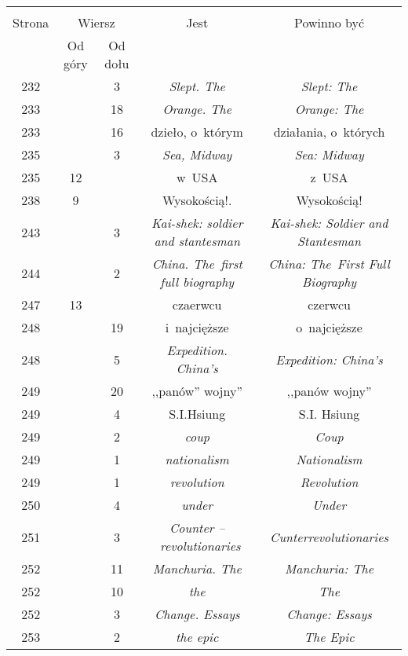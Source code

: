 \documentclass[a4paper,11pt]{article}
\begin{document}
\begin{center}
  \begin{tabular}{|c|c|c|c|c|}
    \hline
    & \multicolumn{2}{c|}{} & & \\
    Strona & \multicolumn{2}{c|}{Wiersz} & Jest
                              & Powinno być \\ \cline{2-3}
    & Od góry & Od dołu & & \\
    \hline
    232 & &  3 & \emph{Slept. The} & \emph{Slept: The} \\
    233 & & 18 & \emph{Orange. The} & \emph{Orange: The} \\
    233 & & 16 & dzieło, o~którym & działania, o~których \\
    235 & &  3 & \emph{Sea, Midway} & \emph{Sea: Midway} \\
    235 & 12 & & w~USA & z~USA \\
    238 &  9 & & Wysokością!. & Wysokością! \\
    243 & &  3 & \emph{Kai-shek: soldier and stantesman}
           & \emph{Kai-shek: Soldier and Stantesman} \\
    244 & &  2 & \emph{China. The~first full biography}
           & \emph{China: The~First Full Biography} \\
    247 & 13 & & czaerwcu & czerwcu \\
    248 & & 19 & i~najcięższe & o~najcięższe \\
    248 & &  5 & \emph{Expedition. China's} & \emph{Expedition: China's} \\
    249 & & 20 & ,,panów'' wojny'' & ,,panów wojny'' \\
    249 & &  4 & S.I.Hsiung & S.I. Hsiung \\
    249 & &  2 & \emph{coup} & \emph{Coup} \\
    249 & &  1 & \emph{nationalism} & \emph{Nationalism} \\
    249 & &  1 & \emph{revolution} & \emph{Revolution} \\
    250 & &  4 & \emph{under} & \emph{Under} \\
    251 & &  3 & \emph{Counter --~revolutionaries}
           & \emph{Cunterrevolutionaries} \\
    252 & & 11 & \emph{Manchuria. The} & \emph{Manchuria: The} \\
    252 & & 10 & \emph{the} & \emph{The} \\
    252 & &  3 & \emph{Change. Essays} & \emph{Change: Essays} \\
    253 & &  2 & \emph{the epic} & \emph{The Epic} \\

\end{tabular}
\end{center}
\end{document}
